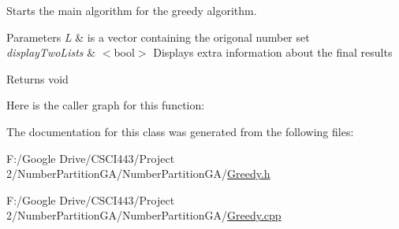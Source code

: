 Starts the main algorithm for the greedy algorithm. 


\begin{DoxyParams}{Parameters}
{\em L} & is a vector containing the origonal number set \\
\hline
{\em display\+Two\+Lists} & $<$bool$>$ Displays extra information about the final results \\
\hline
\end{DoxyParams}
\begin{DoxyReturn}{Returns}
void 
\end{DoxyReturn}
Here is the caller graph for this function\+:


The documentation for this class was generated from the following files\+:\begin{DoxyCompactItemize}
\item 
F\+:/\+Google Drive/\+C\+S\+C\+I443/\+Project 2/\+Number\+Partition\+G\+A/\+Number\+Partition\+G\+A/\hyperlink{_greedy_8h}{Greedy.\+h}\item 
F\+:/\+Google Drive/\+C\+S\+C\+I443/\+Project 2/\+Number\+Partition\+G\+A/\+Number\+Partition\+G\+A/\hyperlink{_greedy_8cpp}{Greedy.\+cpp}\end{DoxyCompactItemize}
